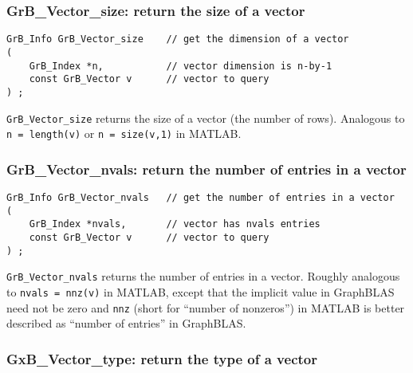 \documentclass[12pt]{article}
\begin{document}
\subsubsection{{\sf GrB\_Vector\_size:}          return the size of a vector}
\label{vector_size}

\begin{mdframed}[userdefinedwidth=6in]
{\footnotesize
\begin{verbatim}
GrB_Info GrB_Vector_size    // get the dimension of a vector
(
    GrB_Index *n,           // vector dimension is n-by-1
    const GrB_Vector v      // vector to query
) ;
\end{verbatim}
} \end{mdframed}

\verb'GrB_Vector_size' returns the size of a vector (the number of rows).
Analogous to \verb'n = length(v)' or \verb'n = size(v,1)' in MATLAB.

\newpage
\subsubsection{{\sf GrB\_Vector\_nvals:}         return the number of entries in a vector}
\label{vector_nvals}

\begin{mdframed}[userdefinedwidth=6in]
{\footnotesize
\begin{verbatim}
GrB_Info GrB_Vector_nvals   // get the number of entries in a vector
(
    GrB_Index *nvals,       // vector has nvals entries
    const GrB_Vector v      // vector to query
) ;
\end{verbatim}
} \end{mdframed}

\verb'GrB_Vector_nvals' returns the number of entries in a vector.  Roughly
analogous to \verb'nvals = nnz(v)' in MATLAB, except that the implicit value in
GraphBLAS need not be zero and \verb'nnz' (short for ``number of nonzeros'') in
MATLAB is better described as ``number of entries'' in GraphBLAS.

\subsubsection{{\sf GxB\_Vector\_type:}          return the type of a vector}
\label{vector_type}
\end{document}
